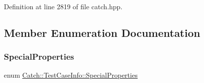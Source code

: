 Definition at line 2819 of file catch.\+hpp.



\subsection{Member Enumeration Documentation}
\hypertarget{struct_catch_1_1_test_case_info_a39b232f74b4a7a6f2183b96759027eac}{}\label{struct_catch_1_1_test_case_info_a39b232f74b4a7a6f2183b96759027eac} 
\subsubsection{\texorpdfstring{Special\+Properties}{SpecialProperties}}
{\footnotesize\ttfamily enum \hyperlink{struct_catch_1_1_test_case_info_a39b232f74b4a7a6f2183b96759027eac}{Catch\+::\+Test\+Case\+Info\+::\+Special\+Properties}}

